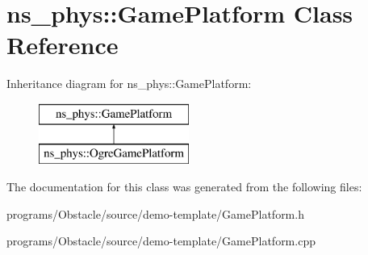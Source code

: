 \hypertarget{classns__phys_1_1_game_platform}{}\section{ns\+\_\+phys\+:\+:Game\+Platform Class Reference}
\label{classns__phys_1_1_game_platform}
Inheritance diagram for ns\+\_\+phys\+:\+:Game\+Platform\+:\begin{figure}[H]
\begin{center}
\leavevmode
\includegraphics[height=2.000000cm]{classns__phys_1_1_game_platform}
\end{center}
\end{figure}


The documentation for this class was generated from the following files\+:\begin{DoxyCompactItemize}
\item 
programs/\+Obstacle/source/demo-\/template/Game\+Platform.\+h\item 
programs/\+Obstacle/source/demo-\/template/Game\+Platform.\+cpp\end{DoxyCompactItemize}
